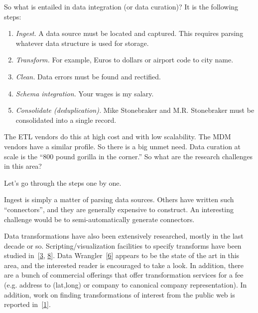 \documentclass[b5paper,11pt,twoside,openright]{book}
\begin{document}
So what is entailed in data integration (or data curation)? It is the
following steps:

\begin{enumerate}
  \item
  \emph{Ingest.} A data source must be located and captured. This
  requires parsing whatever data structure is used for storage.
  \item
  \emph{Transform.} For example, Euros to dollars or airport code to
  city name.
  \item
  \emph{Clean.} Data errors must be found and rectified.
  \item
  \emph{Schema integration.} Your wages is my salary.
  \item
  \emph{Consolidate (deduplication).} Mike Stonebraker and M.R.
  Stonebraker must be consolidated into a single record.
\end{enumerate}

The ETL vendors do this at high cost and with low scalability. The MDM
vendors have a similar profile. So there is a big unmet need. Data
curation at scale is the ``800 pound gorilla in the corner.'' So what
are the research challenges in this area?

Let's go through the steps one by one.

Ingest is simply a matter of parsing data sources. Others have written
such ``connectors'', and they are generally expensive to construct. An
interesting challenge would be to semi-automatically generate
connectors.

Data transformations have also been extensively researched, mostly in
the last decade or so. Scripting/visualization facilities to specify
transforms have been studied in~{{[}\protect\hyperlink{ref-morpheus}{3},
  \protect\hyperlink{ref-potterswheel}{8}{]}}. Data
Wrangler~{{[}\protect\hyperlink{ref-wrangler}{6}{]}} appears to be the
state of the art in this area, and the interested reader is encouraged
to take a look. In addition, there are a bunch of commercial offerings
that offer transformation services for a fee (e.g. address to (lat,long)
or company to canonical company representation). In addition, work on
finding transformations of interest from the public web is reported
in~{{[}\protect\hyperlink{ref-dataxformer}{1}{]}}.
\end{document}
